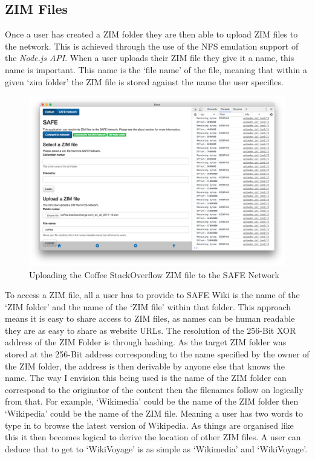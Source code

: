 \subsection{ZIM Files}

Once a user has created a ZIM folder they are then able to upload ZIM files to the network. This is achieved through the use of the NFS emulation support of the \textit{Node.js API}.  When a user uploads their ZIM file they give it a name, this name is important. This name is the `file name' of the file, meaning that within a given `zim folder' the ZIM file is stored against the name the user specifies.

\begin{figure}[h]
	\begin{center}
		\includegraphics[width=\textwidth]{images/safe-wiki-uploading-coffee}
		\caption{Uploading the Coffee StackOverflow ZIM file to the SAFE Network}
		\label{fig:safe-upload-coffee}
	\end{center}
\end{figure}

To access a ZIM file, all a user has to provide to SAFE Wiki is the name of the `ZIM folder' and the name of the `ZIM file' within that folder. This approach means it is easy to share access to ZIM files, as names can be human readable they are as easy to share as website URLs. The resolution of the 256-Bit XOR address of the ZIM Folder is through hashing. As the target ZIM folder was stored at the 256-Bit address corresponding to the name specified by the owner of the ZIM folder, the address is then derivable by anyone else that knows the name. The way I envision this being used is the name of the ZIM folder can correspond to the originator of the content then the filenames follow on logically from that. For example, `Wikimedia' could be the name of the ZIM folder then `Wikipedia' could be the name of the ZIM file. Meaning a user has two words to type in to browse the latest version of Wikipedia. As things are organised like this it then becomes logical to derive the location of other ZIM files. A user can deduce that to get to `WikiVoyage' is as simple as `Wikimedia' and `WikiVoyage'.


